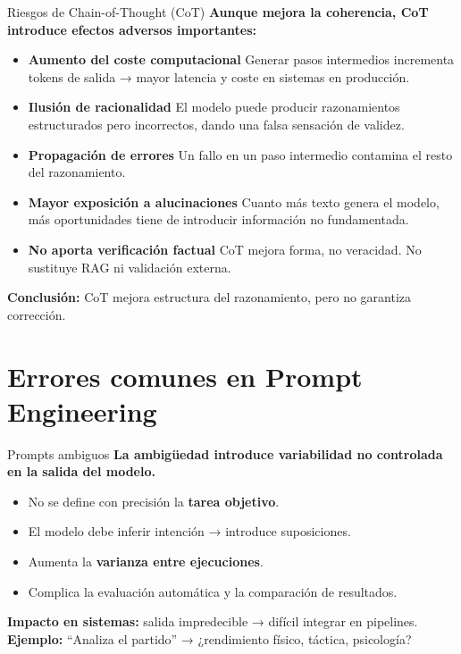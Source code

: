 \documentclass[aspectratio=169]{beamer}
\begin{document}
\begin{frame}{Riesgos de Chain-of-Thought (CoT)}
\textbf{Aunque mejora la coherencia, CoT introduce efectos adversos importantes:}
\vspace{0.5em}
\begin{itemize}
    \item \textbf{Aumento del coste computacional}  
    Generar pasos intermedios incrementa tokens de salida → mayor latencia y coste en sistemas en producción.

    \item \textbf{Ilusión de racionalidad}  
    El modelo puede producir razonamientos estructurados pero incorrectos, dando una falsa sensación de validez.

    \item \textbf{Propagación de errores}  
    Un fallo en un paso intermedio contamina el resto del razonamiento.

    \item \textbf{Mayor exposición a alucinaciones}  
    Cuanto más texto genera el modelo, más oportunidades tiene de introducir información no fundamentada.

    \item \textbf{No aporta verificación factual}  
    CoT mejora forma, no veracidad. No sustituye RAG ni validación externa.

\end{itemize}

\vspace{0.4em}
\textbf{Conclusión:} CoT mejora estructura del razonamiento, pero no garantiza corrección.

\end{frame}


\section{Errores comunes en Prompt Engineering}
\frame{\sectionpage}

\begin{frame}{Prompts ambiguos}
\textbf{La ambigüedad introduce variabilidad no controlada en la salida del modelo.}
\vspace{0.4em}
\begin{itemize}
    \item No se define con precisión la \textbf{tarea objetivo}.
    \item El modelo debe inferir intención → introduce suposiciones.
    \item Aumenta la \textbf{varianza entre ejecuciones}.
    \item Complica la evaluación automática y la comparación de resultados.
\end{itemize}
\vspace{0.4em}
\textbf{Impacto en sistemas:} salida impredecible → difícil integrar en pipelines.
\textbf{Ejemplo:} “Analiza el partido” → ¿rendimiento físico, táctica, psicología?
\end{frame}
\end{document}
